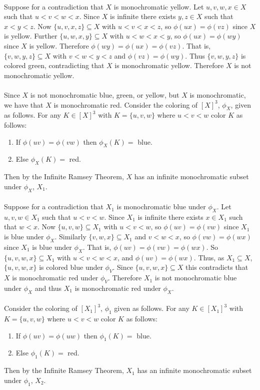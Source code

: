 \documentclass[letterpaper,12pt,oneside,onecolumn]{article}
\begin{document}
\paragraph{}
Suppose for a contradiction that $X$ is monochromatic yellow. Let $u,v,w,x \in X$ such that $u<v<w<x$. Since $X$ is infinite there exists $y,z \in X$ such that $x<y<z$. Now $\{u,v,x,z\} \subseteq X$ with $u<v<x<z$, so $\phi(ux) = \phi(vz)$ since $X$ is yellow. Further $\{u,w,x,y\} \subseteq X$ with $u<w<x<y$, so $\phi(ux) = \phi(wy)$ since $X$ is yellow. Therefore $\phi(wy) = \phi(ux) = \phi(vz)$. That is, $\{v,w,y,z\} \subseteq X$ with $v<w<y<z$ and $\phi(vz) = \phi(wy)$. Thus $\{v,w,y,z\}$ is colored green, contradicting that $X$ is monochromatic yellow. Therefore $X$ is not monochromatic yellow.
\paragraph{}
Since $X$ is not monochromatic blue, green, or yellow, but $X$ is monochromatic, we have that $X$ is monochromatic red. Consider the coloring of $[X]^3$, $\phi_X$, given as follows. For any $K \in [X]^3$ with $K = \{u,v,w\}$ where $u<v<w$ color $K$ as follows:
\begin{enumerate}
\item If $\phi(uv) = \phi(vw)$ then $\phi_X(K)=$ blue.
\item Else $\phi_X(K)=$ red.
\end{enumerate}
Then by the Infinite Ramsey Theorem, $X$ has an infinite monochromatic subset under $\phi_X$, $X_1$.
\paragraph{}
Suppose for a contradiction that $X_1$ is monochromatic blue under $\phi_X$. Let $u,v,w \in X_1$ such that $u<v<w$. Since $X_1$ is infinite there exists $x \in X_1$ such that $w<x$. Now $\{u,v,w\} \subseteq X_1$ with $u<v<w$, so $\phi(uv) = \phi(vw)$ since $X_1$ is blue under $\phi_X$. Similarly $\{v,w,x\} \subseteq X_1$ and $v<w<x$, so $\phi(vw) = \phi(wx)$ since $X_1$ is blue under $\phi_X$. That is, $\phi(uv) = \phi(vw) = \phi(wx)$. So $\{u,v,w,x\} \subseteq X_1$ with $u<v<w<x$, and $\phi(uv) = \phi(wx)$. Thus, as $X_1 \subseteq X$, $\{u,v,w,x\}$ is colored blue under $\phi_V$. Since $\{u,v,w,x\} \subseteq X$ this contradicts that $X$ is monochromatic red under $\phi_V$. Therefore $X_1$ is not monochromatic blue under $\phi_X$ and thus $X_1$ is monochromatic red under $\phi_X$.
\paragraph{}
Consider the coloring of $[X_1]^3$, $\phi_1$ given as follows. For any $K \in [X_1]^3$ with $K = \{u,v,w\}$ where $u<v<w$ color $K$ as follows:
\begin{enumerate}
\item If $\phi(uv) = \phi(uw)$ then $\phi_1(K)=$ blue.
\item Else $\phi_1(K)=$  red.
\end{enumerate}
Then by the Infinite Ramsey Theorem, $X_1$ has an infinite monochromatic subset under $\phi_1$, $X_2$.
\end{document}
